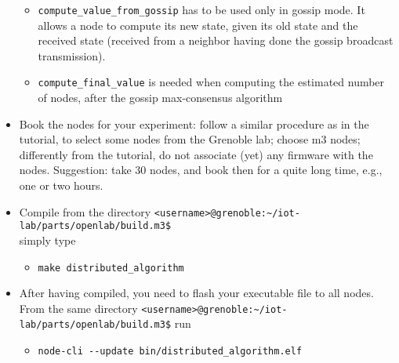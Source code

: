 \documentclass{article}
\begin{document}
\begin{itemize}
\begin{itemize}
	\item \verb=compute_value_from_gossip= has to be used only in gossip mode. It allows a node to compute its new state, given its old state and the received state (received from a neighbor having done the gossip broadcast transmission).
	\item \verb=compute_final_value= is needed when computing the estimated number of nodes, after the gossip max-consensus algorithm
	\end{itemize}
\item Book the nodes for your experiment: follow a similar procedure as in the tutorial,
to select some nodes from the Grenoble lab; choose m3 nodes; differently from the tutorial,  do not
associate (yet) any firmware with the nodes.
Suggestion: take $30$ nodes, and book then for a quite long time, e.g., one or two hours.
\item Compile from the directory \verb=<username>@grenoble:~/iot-lab/parts/openlab/build.m3$=\\
    simply type
    \begin{itemize}
        \item \verb=make distributed_algorithm=
    \end{itemize}
\item After having compiled, you need to flash your executable file to all nodes.
    From the same directory \verb=<username>@grenoble:~/iot-lab/parts/openlab/build.m3$= run
    \begin{itemize}
        \item \verb=node-cli --update bin/distributed_algorithm.elf=
    \end{itemize}


\end{itemize}
\end{document}
